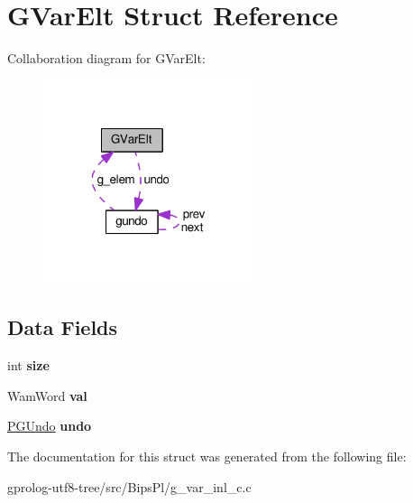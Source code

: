 \hypertarget{structGVarElt}{}\section{G\+Var\+Elt Struct Reference}
\label{structGVarElt}


Collaboration diagram for G\+Var\+Elt\+:\nopagebreak
\begin{figure}[H]
\begin{center}
\leavevmode
\includegraphics[width=175pt]{structGVarElt__coll__graph}
\end{center}
\end{figure}
\subsection*{Data Fields}
\begin{DoxyCompactItemize}
\item 
int {\bfseries size}\hypertarget{structGVarElt_a34b84647c8816d970311d1a2b3b2fd76}{}\label{structGVarElt_a34b84647c8816d970311d1a2b3b2fd76}

\item 
Wam\+Word {\bfseries val}\hypertarget{structGVarElt_a504e22949f6283a81b42cd76a0016c63}{}\label{structGVarElt_a504e22949f6283a81b42cd76a0016c63}

\item 
\hyperlink{structgundo}{P\+G\+Undo} {\bfseries undo}\hypertarget{structGVarElt_a2c5c97b5670810ddda1590885bdede42}{}\label{structGVarElt_a2c5c97b5670810ddda1590885bdede42}

\end{DoxyCompactItemize}


The documentation for this struct was generated from the following file\+:\begin{DoxyCompactItemize}
\item 
gprolog-\/utf8-\/tree/src/\+Bips\+Pl/g\+\_\+var\+\_\+inl\+\_\+c.\+c\end{DoxyCompactItemize}
